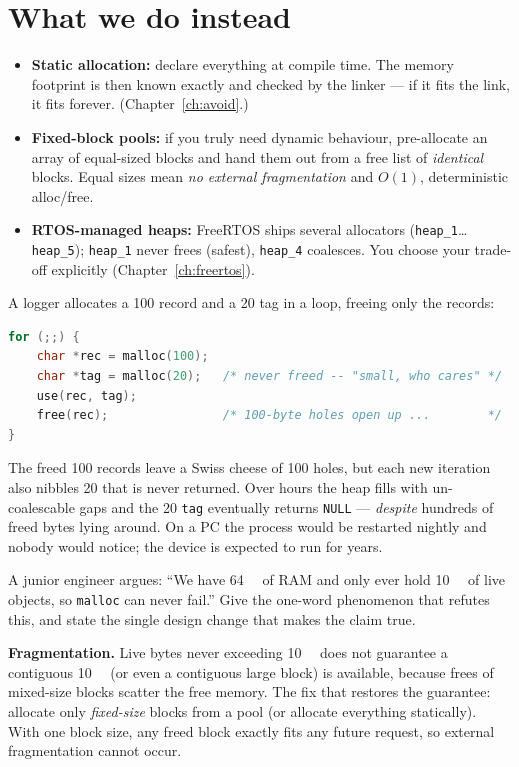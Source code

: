 \documentclass[11pt,a4paper,oneside]{book}
\newcommand{\code}[1]{\texttt{#1}}
\begin{document}
\section{What we do instead}
\begin{itemize}[leftmargin=1.4cm]
  \item \textbf{Static allocation:} declare everything at compile time. The
        memory footprint is then known exactly and checked by the linker ---
        if it fits the link, it fits forever. (Chapter~\ref{ch:avoid}.)
  \item \textbf{Fixed-block pools:} if you truly need dynamic behaviour,
        pre-allocate an array of equal-sized blocks and hand them out from a free
        list of \emph{identical} blocks. Equal sizes mean \emph{no external
        fragmentation} and $O(1)$, deterministic alloc/free.
  \item \textbf{RTOS-managed heaps:} FreeRTOS ships several allocators
        (\code{heap\_1}\ldots\code{heap\_5}); \code{heap\_1} never frees (safest),
        \code{heap\_4} coalesces. You choose your trade-off explicitly
        (Chapter~\ref{ch:freertos}).
\end{itemize}

\begin{wexample}
A logger allocates a \qty{100}{\byte} record and a \qty{20}{\byte} tag in a
loop, freeing only the records:
\begin{lstlisting}[language=C]
for (;;) {
    char *rec = malloc(100);
    char *tag = malloc(20);   /* never freed -- "small, who cares" */
    use(rec, tag);
    free(rec);                /* 100-byte holes open up ...        */
}
\end{lstlisting}
The freed \qty{100}{\byte} records leave a Swiss cheese of \qty{100}{\byte}
holes, but each new iteration also nibbles \qty{20}{\byte} that is never
returned. Over hours the heap fills with un-coalescable gaps and the
\qty{20}{\byte} \code{tag} eventually returns \code{NULL} --- \emph{despite}
hundreds of freed bytes lying around. On a PC the process would be restarted
nightly and nobody would notice; the device is expected to run for years.
\end{wexample}

\begin{exercise}
A junior engineer argues: ``We have \qty{64}{\kilo\byte} of RAM and only ever
hold \qty{10}{\kilo\byte} of live objects, so \code{malloc} can never fail.''
Give the one-word phenomenon that refutes this, and state the single design
change that makes the claim true.
\end{exercise}
\begin{solution}
\textbf{Fragmentation.} Live bytes never exceeding \qty{10}{\kilo\byte} does not
guarantee a contiguous \qty{10}{\kilo\byte} (or even a contiguous large block) is
available, because frees of mixed-size blocks scatter the free memory. The fix
that restores the guarantee: allocate only \emph{fixed-size} blocks from a pool
(or allocate everything statically). With one block size, any freed block
exactly fits any future request, so external fragmentation cannot occur.
\end{solution}
\end{document}
